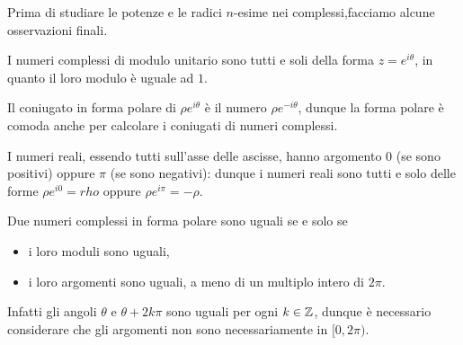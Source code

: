 Prima di studiare le potenze e le radici $n$-esime nei complessi,facciamo alcune osservazioni finali.
\begin{remark}
    I numeri complessi di modulo unitario sono tutti e soli della forma $z = e^{i\theta}$, in quanto il loro modulo è uguale ad $1$.
\end{remark}
\begin{remark}
    Il coniugato in forma polare di $\rho e^{i\theta}$ è il numero $\rho e^{-i\theta}$, dunque la forma polare è comoda anche per calcolare i coniugati di numeri complessi.
\end{remark} 
\begin{remark}
    I numeri reali, essendo tutti sull'asse delle ascisse, hanno argomento $0$ (se sono positivi) oppure $\pi$ (se sono negativi): dunque i numeri reali sono tutti e solo delle forme $\rho e^{i0} = rho$ oppure $\rho e^{i\pi} = -\rho$.
\end{remark}
\begin{remark}
    Due numeri complessi in forma polare sono uguali se e solo se \begin{itemize}
        \item i loro moduli sono uguali,
        \item i loro argomenti sono uguali, a meno di un multiplo intero di $2\pi$.
    \end{itemize}
    Infatti gli angoli $\theta$ e $\theta + 2k\pi$ sono uguali per ogni $k \in \mathbb{Z}$, dunque è necessario considerare che gli argomenti non sono necessariamente in $[0, 2\pi)$.
\end{remark}